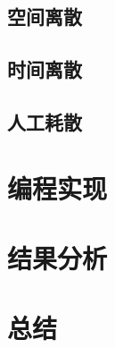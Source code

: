 \documentclass[UTF8]{ctexart}
\begin{document}
\subsection{空间离散}

\subsection{时间离散}

\subsection{人工耗散}

\section{编程实现}

\section{结果分析}

\section{总结}
\end{document}
